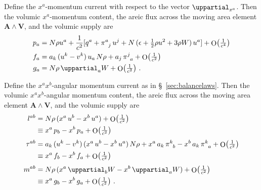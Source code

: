 \documentclass[a4paper,12pt,%
onecolumn,oneside,article,%
british%
]{memoir}
\theoremstyle{remark}
\theoremstyle{innote}
\newcommand*{\de}{\mathop{}\!\uppartial}%
\DeclareMathOperator{\Ord}{O}%
\renewcommand*{\|}[1][]{\nonscript\:#1\vert\nonscript\:\mathopen{}}
\newcommand*{\sect}{\S}%
\renewcommand*{\i}{{}\indices}
\newcommand*{\se}[1]{\de_{#1}}
\newcommand*{\yW}{W}
\newcommand*{\Oc}[1]{\Ord\bigl(\tfrac{1}{c^{#1}}\bigr)}
\begin{document}
Define the $x^{a}$-momentum current with respect to the vector $\se{x^{a}}$. Then the volumic $x^{a}$-momentum content, the areic flux across the moving area element $\bm{A}\land\bm{V}$, and the volumic supply are
\begin{equation}
  \label{eq:momentum_matter_GCRS}
  \begin{aligned}
    p_{a} &=
    N\rho u^{a} + \frac{1}{c^{2}} [
    q^{a} + \pi\i{^{a}_{j}}\,u^{j} +
    N\,(\epsilon + \tfrac12 \rho u^{2} + 3\rho\yW)\, u^{a}
    ] + \Oc{4}
    \\
    f_{a} &=
    \!\begin{multlined}[t][0.8\linewidth]
      a_{k}\,(u^{k}-v^{k})\,u_{a}\,N\rho + a_{j}\,\pi\i{^{j}_{a}} +
      \Oc{2}
    \end{multlined}
    \\
    g_{a} &= N\rho\de_{a}\yW + \Oc{2} \ .
  \end{aligned}
\end{equation}

Define the $x^{a}x^{b}$-angular momentum current as in \sect~\ref{sec:balancelaws}. Then the volumic $x^{a}x^{b}$-angular momentum content, the areic flux across the moving area element $\bm{A}\land\bm{V}$, and the volumic supply are
\begin{equation}
  \label{eq:ang_momentum_matter_GCRS}
  \begin{aligned}
    l^{ab} &=
    N\rho\, (x^{a}\,u^{b} - x^{b}\,u^{a}) + \Oc{2}
    \\
    &\equiv x^{a}\,p_{b} - x^{b}\,p_{a} + \Oc{2}
    \\[\jot]
    \tau^{ab} &=
    \!\begin{multlined}[t][0.8\linewidth]
      a_{k}\,(u^{k}-v^{k}) \, (x^{a}\,u^{b} - x^{b}\,u^{a})\,N\rho +
      x^{a}\,a_{k}\,\pi\i{^{k}_{b}} - x^{b}\,a_{k}\,\pi\i{^{k}_{a}} +
      \Oc{2}
    \end{multlined}
    \\
    &\equiv x^{a}\,f_{b} - x^{b}\,f_{a} + \Oc{2}
    \\[\jot]
    m^{ab} &= N\rho\,(x^{a}\de_{b}\yW - x^{b}\de_{a}\yW)+ \Oc{2} 
    \\
    &\equiv x^{a}\,g_{b} - x^{b}\,g_{a} + \Oc{2} \ .
  \end{aligned}
\end{equation}
\end{document}

